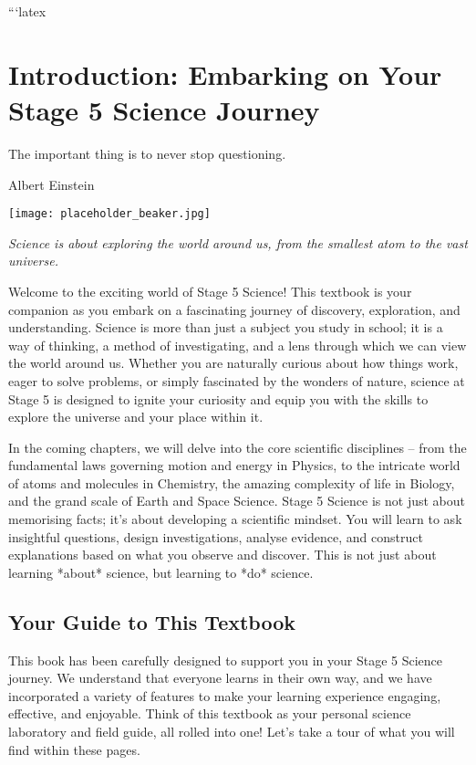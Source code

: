 ```latex
\chapter{Introduction: Embarking on Your Stage 5 Science Journey}

\epigraph{The important thing is to never stop questioning.}{Albert Einstein}

\begin{marginfigure}[0pt]
\texttt{[image: placeholder\_beaker.jpg]}
\caption*{}
\textit{Science is about exploring the world around us, from the smallest atom to the vast universe.}
\end{marginfigure}

Welcome to the exciting world of Stage 5 Science!  This textbook is your companion as you embark on a fascinating journey of discovery, exploration, and understanding.  Science is more than just a subject you study in school; it is a way of thinking, a method of investigating, and a lens through which we can view the world around us.  Whether you are naturally curious about how things work, eager to solve problems, or simply fascinated by the wonders of nature, science at Stage 5 is designed to ignite your curiosity and equip you with the skills to explore the universe and your place within it.

In the coming chapters, we will delve into the core scientific disciplines – from the fundamental laws governing motion and energy in Physics, to the intricate world of atoms and molecules in Chemistry, the amazing complexity of life in Biology, and the grand scale of Earth and Space Science.  Stage 5 Science is not just about memorising facts; it's about developing a scientific mindset. You will learn to ask insightful questions, design investigations, analyse evidence, and construct explanations based on what you observe and discover.  This is not just about learning *about* science, but learning to *do* science.

\FloatBarrier

\section{Your Guide to This Textbook}

This book has been carefully designed to support you in your Stage 5 Science journey.  We understand that everyone learns in their own way, and we have incorporated a variety of features to make your learning experience engaging, effective, and enjoyable.  Think of this textbook as your personal science laboratory and field guide, all rolled into one! Let's take a tour of what you will find within these pages.

